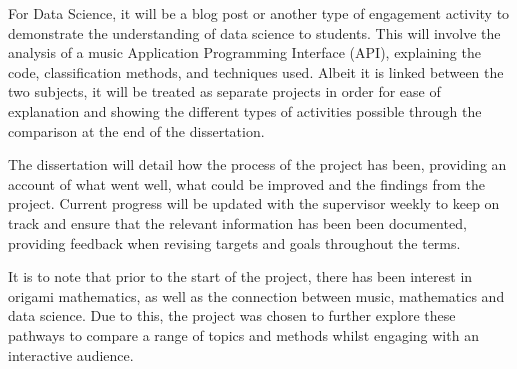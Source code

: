 \documentclass{article}
\begin{document}
For Data Science, it will be a blog post or another type of engagement activity to demonstrate the understanding of data science to students. This will involve the analysis of a music Application Programming Interface (API), explaining the code, classification methods, and techniques used. Albeit it is linked between the two subjects, it will be treated as separate projects in order for ease of explanation and showing the different types of activities possible through the comparison at the end of the dissertation.

The dissertation will detail how the process of the project has been, providing an account of what went well, what could be improved and the findings from the project. Current progress will be updated with the supervisor weekly to keep on track and ensure that the relevant information has been been documented, providing feedback when revising targets and goals throughout the terms.

It is to note that prior to the start of the project, there has been interest in origami mathematics, as well as the connection between music, mathematics and data science. Due to this, the project was chosen to further explore these pathways to compare a range of topics and methods whilst engaging with an interactive audience.
\end{document}
